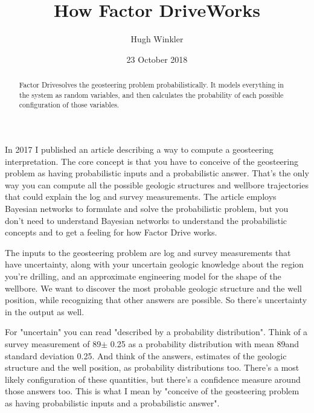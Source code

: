 \documentclass{tufte-handout}
\title{How Factor Drive\texttrademark Works}
\author[Hugh Winkler]{Hugh Winkler}
\date{23 October 2018}  %
\begin{document}
\maketitle%

\begin{abstract}
\noindent
Factor Drive\texttrademark solves the geosteering problem probabilistically.
It models everything in the system as random variables, and then  
calculates the probability of each possible configuration of those variables.
\end{abstract}


In 2017 I published an article\cite{Winkler2017}  describing a way to
compute a geosteering interpretation. The core concept is that
you have to conceive of the geosteering problem as having probabilistic inputs and a probabilistic answer. 
That's the only way you can compute all the
possible geologic structures and wellbore trajectories that could explain the log
and survey measurements.
The article employs Bayesian networks to formulate and solve the probabilistic problem, but you
don't need to understand Bayesian networks to understand the probabilistic concepts and to get
a feeling for how Factor Drive works. 

The inputs to the geosteering problem are log and survey measurements that have uncertainty,
along with your uncertain geologic knowledge about the region you're drilling, and
an approximate engineering model for the shape of the wellbore.
We want to  discover the most probable geologic structure and 
the well position, while recognizing that other answers are possible. So there's 
uncertainty in the output as well.

For "uncertain" you can read "described by a probability distribution".
Think of a survey measurement of 89\textdegree $\pm$ 0.25\textdegree 
as a probability distribution with mean 89\textdegree and standard deviation 
0.25\textdegree. And think of the answers, estimates of the geologic structure and 
the well position, as probability distributions too. There's a most likely
configuration of these quantities, but there's a confidence measure around those answers too. 
This is what I mean by "conceive of the geosteering problem as having probabilistic 
inputs and a probabilistic answer".
\end{document}
